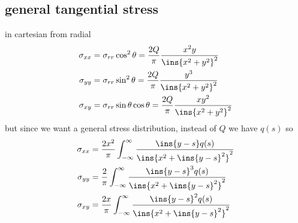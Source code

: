 \subsection{general tangential stress}
in cartesian from radial 
\begin{align}
	\sigma_{xx}&=\sigma_{rr}\cos^2\theta=\frac{2Q}{\pi}\frac{x^2y}{\ins{x^2+y^2}^2}\\
	\sigma_{yy}&=\sigma_{rr}\sin^2\theta=\frac{2Q}{\pi}\frac{y^3}{\ins{x^2+y^2}^2}\\
	\sigma_{xy}&=\sigma_{rr}\sin\theta\cos\theta=\frac{2Q}{\pi}\frac{xy^2}{\ins{x^2+y^2}^2}
\end{align}
but since we want a general stress distribution, instead of \(Q\) we have \(q(s)\) so
\begin{align}
	\sigma_{xx}&=\frac{2x^2}{\pi}\int_{-\infty}^{\infty}\frac{\ins{y-s}q(s)}{\ins{x^2+\ins{y-s}^2}^2}\\
	\sigma_{yy}&=\frac{2}{\pi}\int_{-\infty}^{\infty}\frac{\ins{y-s}^3q(s)}{\ins{x^2+\ins{y-s}^2}^2}\\
	\sigma_{xy}&=\frac{2x}{\pi}\int_{-\infty}^{\infty}\frac{\ins{y-s}^2q(s)}{\ins{x^2+\ins{y-s}^2}^2}
\end{align}